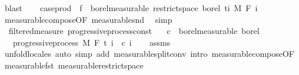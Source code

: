 \begin{isabellebody}
\ blast\isanewline
\ \ \isamarkupfalse%
\ {\isachardoublequoteopen}case{\isacharunderscore}{\kern0pt}prod\ {\isacharparenleft}{\kern0pt}{\isasymlambda}{\isacharunderscore}{\kern0pt}{\isachardot}{\kern0pt}\ f{\isacharparenright}{\kern0pt}\ {\isasymin}\ borel{\isacharunderscore}{\kern0pt}measurable\ {\isacharparenleft}{\kern0pt}restrict{\isacharunderscore}{\kern0pt}space\ borel\ {\isacharbraceleft}{\kern0pt}ti{\isacharbraceright}{\kern0pt}\ {\isasymOtimes}\isactrlsub M\ F\ i{\isacharparenright}{\kern0pt}{\isachardoublequoteclose}\ \isamarkupfalse%
\ measurable{\isacharunderscore}{\kern0pt}compose{\isacharbrackleft}{\kern0pt}OF\ measurable{\isacharunderscore}{\kern0pt}snd{\isacharbrackright}{\kern0pt}\ \isamarkupfalse%
\ simp\isanewline
{}\isamarkupfalse%
%
\endisatagproof
{\isafoldproof}%
%
\isadelimproof
\isanewline
%
\endisadelimproof
\isanewline
{}\isamarkupfalse%
\ {\isacharparenleft}{\kern0pt}\ filtered{\isacharunderscore}{\kern0pt}measure{\isacharparenright}{\kern0pt}\ progressive{\isacharunderscore}{\kern0pt}process{\isacharunderscore}{\kern0pt}const{\isacharcolon}{\kern0pt}\isanewline
\ \ \ {\isachardoublequoteopen}c\ {\isasymin}\ borel{\isacharunderscore}{\kern0pt}measurable\ borel{\isachardoublequoteclose}\isanewline
\ \ \ {\isachardoublequoteopen}progressive{\isacharunderscore}{\kern0pt}process\ M\ F\ t\ {\isacharparenleft}{\kern0pt}{\isasymlambda}i\ {\isacharunderscore}{\kern0pt}{\isachardot}{\kern0pt}\ c\ i{\isacharparenright}{\kern0pt}{\isachardoublequoteclose}\isanewline
%
\isadelimproof
\ \ %
\endisadelimproof
%
\isatagproof
{}\isamarkupfalse%
\ assms\ \isamarkupfalse%
\ {\isacharparenleft}{\kern0pt}unfold{\isacharunderscore}{\kern0pt}locales{\isacharparenright}{\kern0pt}\ {\isacharparenleft}{\kern0pt}auto\ simp\ add{\isacharcolon}{\kern0pt}\ measurable{\isacharunderscore}{\kern0pt}split{\isacharunderscore}{\kern0pt}conv\ intro{\isacharbang}{\kern0pt}{\isacharcolon}{\kern0pt}\ measurable{\isacharunderscore}{\kern0pt}compose{\isacharbrackleft}{\kern0pt}OF\ measurable{\isacharunderscore}{\kern0pt}fst{\isacharbrackright}{\kern0pt}\ measurable{\isacharunderscore}{\kern0pt}restrict{\isacharunderscore}{\kern0pt}space{}{\isacharparenright}{\kern0pt}%
\endisatagproof
{\isafoldproof}%
%
\isadelimproof
\isanewline
%
\endisadelimproof
\isanewline
{}\isamarkupfalse%

\end{isabellebody}

